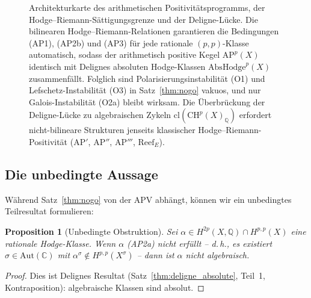 \documentclass[aps,prd,twocolumn,superscriptaddress,nofootinbib]{revtex4-2}
\newtheorem{proposition}[theorem]{Proposition}
\theoremstyle{definition}
\theoremstyle{remark}
\begin{document}
\begin{figure}[tb]
{}
\caption{Architekturkarte des arithmetischen Positivitätsprogramms, der Hodge--Riemann-Sättigungsgrenze und der Deligne-Lücke. Die bilinearen Hodge--Riemann-Relationen garantieren die Bedingungen (AP1), (AP2b) und (AP3) für jede rationale $(p,p)$-Klasse automatisch, sodass der arithmetisch positive Kegel $\mathrm{AP}^p(X)$ identisch mit Delignes absoluten Hodge-Klassen $\mathrm{AbsHodge}^p(X)$ zusammenfällt. Folglich sind Polarisierungsinstabilität (O1) und Lefschetz-Instabilität (O3) in Satz~\ref{thm:nogo} vakuos, und nur Galois-Instabilität (O2a) bleibt wirksam. Die Überbrückung der Deligne-Lücke zu algebraischen Zykeln $\mathrm{cl}(\mathrm{CH}^p(X)_\mathbb{Q})$ erfordert nicht-bilineare Strukturen jenseits klassischer Hodge--Riemann-Positivität ($\mathrm{AP}'$, $\mathrm{AP}''$, $\mathrm{AP}'''$, $\mathrm{Reef}_E$).}
\label{fig:ap_saturation_boundary}
\end{figure}

\subsection{Die unbedingte Aussage}

Während Satz~\ref{thm:nogo} von der APV abhängt, können wir ein unbedingtes Teilresultat formulieren:

\begin{proposition}[Unbedingte Obstruktion]
\label{prop:unconditional}
Sei $\alpha \in H^{2p}(X, \mathbb{Q}) \cap H^{p,p}(X)$ eine rationale Hodge-Klasse. Wenn $\alpha$ (AP2a) nicht erfüllt -- d.\,h., es existiert $\sigma \in \mathrm{Aut}(\mathbb{C})$ mit $\alpha^\sigma \notin H^{p,p}(X^\sigma)$ -- dann ist $\alpha$ nicht algebraisch.
\end{proposition}

\begin{proof}
Dies ist Delignes Resultat (Satz~\ref{thm:deligne_absolute}, Teil~1, Kontraposition): algebraische Klassen sind absolut.
\end{proof}
\end{document}
